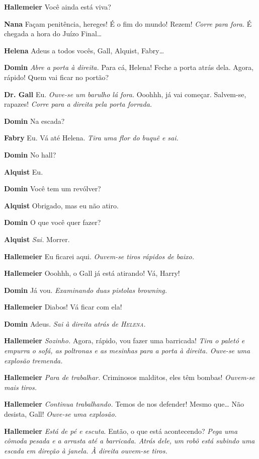 \textbf{Hallemeier} Você ainda está viva?

\textbf{Nana} Façam penitência, hereges! É o fim do mundo! Rezem! \emph{Corre para
fora.} É chegada a hora do Juízo Final\ldots{}

\textbf{Helena} Adeus a todos vocês, Gall, Alquist, Fabry\ldots{}

\textbf{Domin} \emph{Abre a porta à direita.} Para cá, Helena! Feche a porta atrás
dela. Agora, rápido! Quem vai ficar no portão?

\textbf{Dr. Gall} Eu. \emph{Ouve-se um barulho lá fora.} Ooohhh, já vai começar.
Salvem-se, rapazes! \emph{Corre para a direita pela porta forrada.}

\textbf{Domin} Na escada?

\textbf{Fabry} Eu. Vá até Helena. \emph{Tira uma flor do buquê e sai.}

\textbf{Domin} No hall?

\textbf{Alquist} Eu.

\textbf{Domin} Você tem um revólver?

\textbf{Alquist} Obrigado, mas eu não atiro.

\textbf{Domin} O que você quer fazer?

\textbf{Alquist} \emph{Sai.} Morrer.

\textbf{Hallemeier} Eu ficarei aqui.
\emph{Ouvem-se tiros rápidos de baixo.}

\textbf{Hallemeier} Ooohhh, o Gall já está atirando! Vá, Harry!

\textbf{Domin} Já vou. \emph{Examinando duas pistolas \emph{browning}.}

\textbf{Hallemeier} Diabos! Vá ficar com ela!

\textbf{Domin} Adeus. \emph{Sai à direita atrás de \textsc{Helena}.}

\textbf{Hallemeier} \emph{Sozinho.} Agora, rápido, vou fazer uma barricada!
\emph{Tira o paletó e empurra o sofá, as poltronas e as mesinhas para a porta à direita.
Ouve-se uma explosão tremenda.}

\textbf{Hallemeier} \emph{Para de trabalhar.} Criminosos malditos, eles têm bombas!
\emph{Ouvem-se mais tiros.}

\textbf{Hallemeier} \emph{Continua trabalhando.} Temos de nos defender! Mesmo
que\ldots{} Não desista, Gall! \emph{Ouve-se uma explosão.}

\textbf{Hallemeier} \emph{Está de pé e escuta}.  Então, o que está
acontecendo? \emph{Pega uma cômoda pesada e a arrasta até a barricada. 
Atrás dele, um robô está subindo uma escada em direção à janela. À
direita ouvem-se tiros.}


